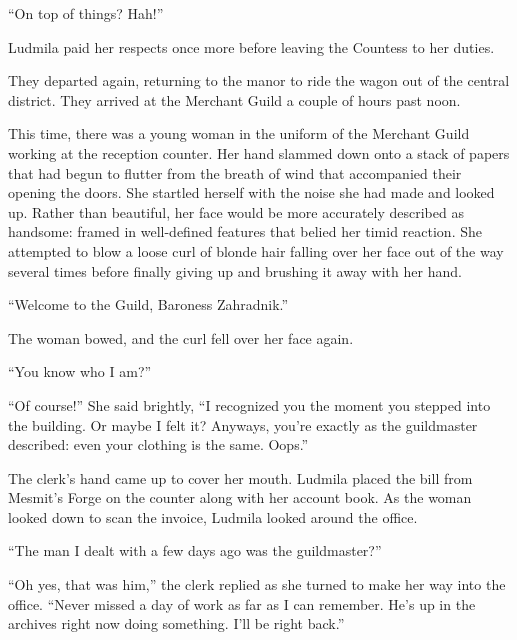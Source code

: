“On top of things? Hah!”

 

Ludmila paid her respects once more before leaving the Countess to her duties.

 

They departed again, returning to the manor to ride the wagon out of the central district. They arrived at the Merchant Guild a couple of hours past noon.

 

This time, there was a young woman in the uniform of the Merchant Guild working at the reception counter. Her hand slammed down onto a stack of papers that had begun to flutter from the breath of wind that accompanied their opening the doors. She startled herself with the noise she had made and looked up. Rather than beautiful, her face would be more accurately described as handsome: framed in well-defined features that belied her timid reaction. She attempted to blow a loose curl of blonde hair falling over her face out of the way several times before finally giving up and brushing it away with her hand.

 

“Welcome to the Guild, Baroness Zahradnik.”

 

The woman bowed, and the curl fell over her face again.

 

“You know who I am?”

 

“Of course!” She said brightly, “I recognized you the moment you stepped into the building. Or maybe I felt it? Anyways, you’re exactly as the guildmaster described: even your clothing is the same. Oops.”

 

The clerk’s hand came up to cover her mouth. Ludmila placed the bill from Mesmit’s Forge on the counter along with her account book. As the woman looked down to scan the invoice, Ludmila looked around the office.

 

“The man I dealt with a few days ago was the guildmaster?”

 

“Oh yes, that was him,” the clerk replied as she turned to make her way into the office. “Never missed a day of work as far as I can remember. He’s up in the archives right now doing something. I’ll be right back.”

 


